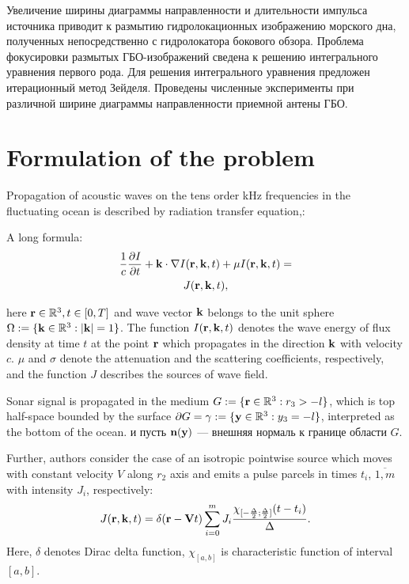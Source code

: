 \documentclass{procDDs}
\begin{document}
Увеличение ширины диаграммы направленности и длительности импульса источника приводит к размытию гидролокационных изображению морского дна, полученных непосредственно с гидролокатора бокового обзора.
Проблема фокусировки размытых ГБО-изображений сведена к решению интегрального уравнения первого рода.
Для решения интегрального уравнения предложен итерационный метод Зейделя. Проведены численные эксперименты при различной ширине диаграммы направленности приемной антены ГБО.




\section{Formulation of the problem}
Propagation of acoustic waves on the tens order kHz frequencies in the fluctuating ocean is described by radiation
transfer equation\cite{p11},\cite{p12}:

A long formula:
\begin{multline}
	\label{model}
	\frac{1}{c} \frac{\partial I}{\partial t} + \mathbf{k} \cdot \nabla I(\mathbf{r},\mathbf{k},t) + 
	\mu I(\mathbf{r},\mathbf{k},t) = \\ J(\mathbf{r},\mathbf{k},t),
\end{multline}

here $\mathbf{r} \in \mathbb{R}^3, t \in [0, T]$ and wave vector $\mathbf{k}$ belongs to the unit sphere $\Omega := \{\mathbf{k} \in \mathbb{R}^3: |\mathbf{k}| = 1\}$. The function $I(\mathbf{r},\mathbf{k}, t)$ denotes the wave energy of flux density at time $t$  at the point $\mathbf{r}$ which propagates in the direction $\mathbf{k}$  with velocity $c$. $\mu$ and $\sigma$ denote the attenuation and the scattering coefficients, respectively, and the function $J$ describes the sources of
wave field.

Sonar signal is propagated in the medium $G:=\{\mathbf{r} \in \mathbb{R}^3:r_3 > -l\}$, which is top half-space bounded by the surface $\partial G = \gamma := \{\mathbf{y} \in \mathbb{R}^3: y_3 = -l \}$, interpreted as the bottom of the ocean. и пусть $\textbf{n}(\mathbf{y})$ --- внешняя нормаль к  границе области $G$. 



Further, authors consider the case of an isotropic pointwise source which moves with constant velocity $V$ along $r_2$ axis and emits a pulse parcels in times $t_i$, $\overline{1,m}$ with intensity $J_i$, respectively: 
\begin{equation}
	\label{source}
	J(\mathbf{r},\mathbf{k}, t) = \delta(\mathbf{r} - \mathbf{V} t)\sum\limits_{i=0}^{m} J_i \frac{ \chi_{[-\frac{\Delta}{2};\frac{\Delta}{2}]}(t-t_i)}{\Delta}.
\end{equation}
Here, $\delta$ denotes Dirac delta function, $\chi_{[a,b]}$ is characteristic function of interval $[a,b]$.
\end{document}
